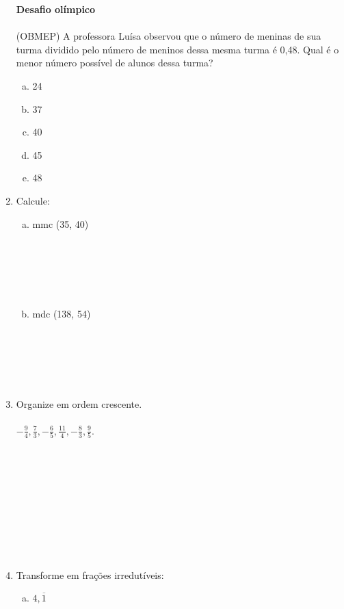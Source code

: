 \documentclass[a4paper,14pt]{article}
\begin{document}
\begin{multicols}{2}
\begin{enumerate}
\begin{enumerate}[a)]
			\end{enumerate}
			\textbf{Desafio olímpico} \\\\
			(OBMEP) A professora Luísa observou que o número de meninas de sua turma dividido pelo número de meninos dessa mesma turma é 0,48. Qual é o menor número possível de alunos dessa turma? \\
			\begin{enumerate}[a)]
				\item 24
				\item 37
				\item 40
				\item 45
				\item 48 \newpage
			\end{enumerate}
			\item Calcule:
			\begin{enumerate}[a)]
				\item mmc (35, 40) \\\\\\\\\\\\
				\item mdc (138, 54) \\\\\\\\\\\\
			\end{enumerate}
			\item Organize em ordem crescente. \\\\
			$-\frac{9}{4}, \frac{7}{3}, - \frac{6}{5}, \frac{11}{4}, -\frac{8}{3}, \frac{9}{5}$. \\\\\\\\\\\\\\\\\\\\
			\item Transforme em frações irredutíveis:
			\begin{enumerate}[a)]
				\item $4,\overline{1}$ \\\\\\\\\\\\\\\\

\end{enumerate}
\end{enumerate}
\end{multicols}
\end{document}
